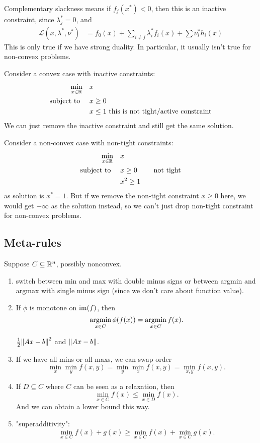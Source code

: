 \documentclass[class=article,crop=false]{standalone}
\begin{document}
\begin{remark}
	Complementary slackness means if $ f_j(x^* )<0$, then this is an inactive constraint, since $ \lambda_j^* =0$, and
	\begin{align*}
		\mathscr{L}(x,\lambda^* ,\nu^* ) &= f_0(x)+ \sum_{i\neq j} \lambda_i^* f_i(x) + \sum \nu_i^* h_i(x) 
	\end{align*}
This is only true if we have strong duality. In particular, it usually isn't true for non-convex problems.
\end{remark}
\begin{eg}[1]
Consider a convex case with inactive constraints:
\begin{align*}
\min_{x \in \mathbb{R}}\quad &x \\
\text{subject to } \quad &x\geq 0 \\
&x\leq 1 \text{ this is not tight/active constraint} 
\end{align*}
We can just remove the inactive constraint and still get the same solution.
\end{eg}
\begin{eg}[2]
Consider a non-convex case with non-tight constraints:
\begin{align*}
\min_{x \in \mathbb{R}}\quad &x \\
\text{subject to } \quad &x\geq 0 \qquad \text{ not tight} \\
&x^2 \geq 1
\end{align*}
as solution is $ x^* =1$. But if we remove the non-tight constraint $ x\geq 0$ here, we would get $ -\infty$ as the solution instead, so we can't just drop non-tight constraint for non-convex problems.
\end{eg}

\subsection{Meta-rules}
Suppose $ C \subseteq \mathbb{R}^{n}$, possibly nonconvex.
\begin{enumerate}[label=(\arabic*)]
	\item switch between min and max with double minus signs or between argmin and argmax with single minus sign (since we don't care about function value).
	\item If $ \phi$ is monotone on $ \operatorname{im}(f)$, then
		\[
			\operatorname*{argmin}_{x \in C} \phi(f(x)) = \operatorname*{argmin}_{x \in C} f(x)
		.\]
		\begin{eg}
		$ \frac{1}{2} {\left\lVert{ Ax-b}\right\rVert}^2 $ and $ {\left\lVert{ Ax-b}\right\rVert} $.
		\end{eg}
	\item If we have all mins or all maxs, we can swap order
		\[
			\min_x \min_y f(x,y) = \min_y \min_x f(x,y) = \min_{x,y} f(x,y)
		.\] 
	\item If $ D \subseteq C$ where $ C$ can be seen as a relaxation, then
		\[
			\min_{x \in C} f(x) \leq \min_{x \in D} f(x)
		.\]
		And we can obtain a lower bound this way.
	\item "superadditivity":
		\[
			\min_{x \in C} f(x)+g(x) \geq \min_{x \in C} f(x) + \min_{x \in C} g(x)
		.\] 
\end{enumerate}
\end{document}

